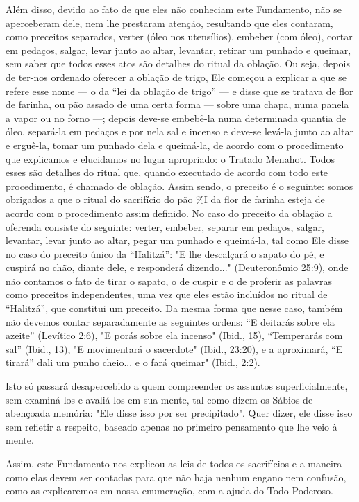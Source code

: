 Além disso, devido ao fato de que eles não conheciam este Funda­mento,
não se aperceberam dele, nem lhe prestaram atenção, resultando que eles
contaram, como preceitos separados, verter (óleo nos utensílios),
embe­ber (com óleo), cortar em pedaços, salgar, levar junto ao altar,
levantar, retirar um punhado e queimar, sem saber que todos esses atos
são detalhes do ritual da oblação. Ou seja, depois de ter-nos ordenado
oferecer a oblação de trigo, Ele começou a explicar a que se refere esse
nome --- o da ``lei da oblação de trigo'' --- e disse que se tratava de
flor de farinha, ou pão assado de uma certa forma --- sobre uma chapa,
numa panela a vapor ou no forno ---; depois de­ve-se embebê-la numa
determinada quantia de óleo, separá-la em pedaços e por nela sal e
incenso e deve-se levá-la junto ao altar e erguê-la, tomar um punhado
dela e queimá-la, de acordo com o procedimento que explicamos e
elucidamos no lugar apropriado: o Tratado Menahot. Todos esses são
detalhes do ritual que, quando executado de acordo com todo este
procedimento, é chamado de obla­ção. Assim sendo, o preceito é o
seguinte: somos obrigados a que o ritual do sacrifício do pão \%I da
flor de farinha esteja de acordo com o procedimento assim definido. No
caso do preceito da oblação a oferenda consiste do seguin­te: verter,
embeber, separar em pedaços, salgar, levantar, levar junto ao altar,
pegar um punhado e queimá-la, tal como Ele disse no caso do preceito
único da ``Halitzá'': "E lhe descalçará o sapato do pé, e cuspirá no chão,
diante dele, e responderá dizendo..." (Deuteronômio 25:9), onde não
contamos o fato de tirar o sapato, o de cuspir e o de proferir as
palavras como preceitos indepen­dentes, uma vez que eles estão incluídos
no ritual de ``Halitzá'', que constitui um preceito. Da mesma forma que
nesse caso, também não devemos contar separadamente as seguintes ordens:
``E deitarás sobre ela azeite'' (Levítico 2:6), "E porás sobre ela
incenso" (Ibid., 15), ``Temperarás com sal'' (Ibid., 13), "E
movimentará o sacerdote" (Ibid., 23:20), e a aproximará, ``E tirará'' dali
um pu­nho cheio... e o fará queimar" (Ibid., 2:2).

Isto só passará desapercebido a quem compreender os assuntos
su­perficialmente, sem examiná-los e avaliá-los em sua mente, tal como
dizem os Sábios de abençoada memória: "Ele disse isso por ser
precipitado". Quer di­zer, ele disse isso sem refletir a respeito,
baseado apenas no primeiro pensa­mento que lhe veio à mente.

Assim, este Fundamento nos explicou as leis de todos os sacrifícios e a
maneira como elas devem ser contadas para que não haja nenhum engano nem
confusão, como as explicaremos em nossa enumeração, com a ajuda do Todo
Poderoso.

